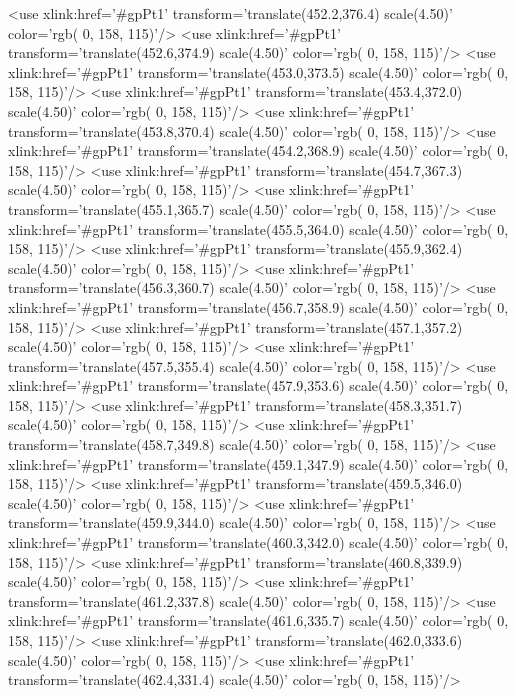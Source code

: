 	<use xlink:href='#gpPt1' transform='translate(452.2,376.4) scale(4.50)' color='rgb(  0, 158, 115)'/>
	<use xlink:href='#gpPt1' transform='translate(452.6,374.9) scale(4.50)' color='rgb(  0, 158, 115)'/>
	<use xlink:href='#gpPt1' transform='translate(453.0,373.5) scale(4.50)' color='rgb(  0, 158, 115)'/>
	<use xlink:href='#gpPt1' transform='translate(453.4,372.0) scale(4.50)' color='rgb(  0, 158, 115)'/>
	<use xlink:href='#gpPt1' transform='translate(453.8,370.4) scale(4.50)' color='rgb(  0, 158, 115)'/>
	<use xlink:href='#gpPt1' transform='translate(454.2,368.9) scale(4.50)' color='rgb(  0, 158, 115)'/>
	<use xlink:href='#gpPt1' transform='translate(454.7,367.3) scale(4.50)' color='rgb(  0, 158, 115)'/>
	<use xlink:href='#gpPt1' transform='translate(455.1,365.7) scale(4.50)' color='rgb(  0, 158, 115)'/>
	<use xlink:href='#gpPt1' transform='translate(455.5,364.0) scale(4.50)' color='rgb(  0, 158, 115)'/>
	<use xlink:href='#gpPt1' transform='translate(455.9,362.4) scale(4.50)' color='rgb(  0, 158, 115)'/>
	<use xlink:href='#gpPt1' transform='translate(456.3,360.7) scale(4.50)' color='rgb(  0, 158, 115)'/>
	<use xlink:href='#gpPt1' transform='translate(456.7,358.9) scale(4.50)' color='rgb(  0, 158, 115)'/>
	<use xlink:href='#gpPt1' transform='translate(457.1,357.2) scale(4.50)' color='rgb(  0, 158, 115)'/>
	<use xlink:href='#gpPt1' transform='translate(457.5,355.4) scale(4.50)' color='rgb(  0, 158, 115)'/>
	<use xlink:href='#gpPt1' transform='translate(457.9,353.6) scale(4.50)' color='rgb(  0, 158, 115)'/>
	<use xlink:href='#gpPt1' transform='translate(458.3,351.7) scale(4.50)' color='rgb(  0, 158, 115)'/>
	<use xlink:href='#gpPt1' transform='translate(458.7,349.8) scale(4.50)' color='rgb(  0, 158, 115)'/>
	<use xlink:href='#gpPt1' transform='translate(459.1,347.9) scale(4.50)' color='rgb(  0, 158, 115)'/>
	<use xlink:href='#gpPt1' transform='translate(459.5,346.0) scale(4.50)' color='rgb(  0, 158, 115)'/>
	<use xlink:href='#gpPt1' transform='translate(459.9,344.0) scale(4.50)' color='rgb(  0, 158, 115)'/>
	<use xlink:href='#gpPt1' transform='translate(460.3,342.0) scale(4.50)' color='rgb(  0, 158, 115)'/>
	<use xlink:href='#gpPt1' transform='translate(460.8,339.9) scale(4.50)' color='rgb(  0, 158, 115)'/>
	<use xlink:href='#gpPt1' transform='translate(461.2,337.8) scale(4.50)' color='rgb(  0, 158, 115)'/>
	<use xlink:href='#gpPt1' transform='translate(461.6,335.7) scale(4.50)' color='rgb(  0, 158, 115)'/>
	<use xlink:href='#gpPt1' transform='translate(462.0,333.6) scale(4.50)' color='rgb(  0, 158, 115)'/>
	<use xlink:href='#gpPt1' transform='translate(462.4,331.4) scale(4.50)' color='rgb(  0, 158, 115)'/>
